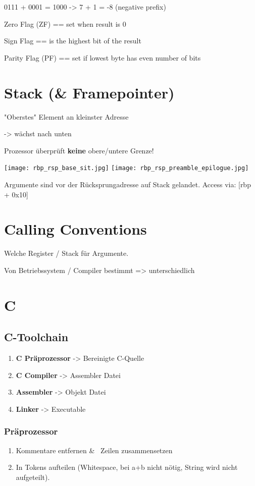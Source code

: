 \begin{multicols*}{4}
0111 + 0001 = 1000 -> 7 + 1 = -8 (negative prefix)

Zero Flag (ZF) == set when result is 0

Sign Flag == is the highest bit of the result

Parity Flag (PF) == set if lowest byte has even number of bits

\section{Stack (\& Framepointer)}
"Oberstes" Element an kleinster Adresse

-> wächst nach unten

Prozessor überprüft \textbf{keine} obere/untere Grenze!

\texttt{[image: rbp\_rsp\_base\_sit.jpg]}
\texttt{[image: rbp\_rsp\_preamble\_epilogue.jpg]}

Argumente sind vor der Rücksprungadresse auf Stack gelandet. Access via: [rbp + 0x10]

\section{Calling Conventions}
Welche Register / Stack für Argumente.

Von Betriebssystem / Compiler bestimmt => unterschiedlich

\section{C}
\subsection{C-Toolchain}
\begin{enumerate}
    \item \textbf{C Präprozessor} -> Bereinigte C-Quelle
    \item \textbf{C Compiler} -> Assembler Datei
    \item \textbf{Assembler} -> Objekt Datei
    \item \textbf{Linker} -> Executable
\end{enumerate}
\subsubsection{Präprozessor}
\begin{enumerate}
    \item Kommentare entfernen \& \ Zeilen zusammensetzen
    \item In Tokens aufteilen (Whitespace, bei a+b nicht nötig, String wird nicht aufgeteilt).


\end{enumerate}
\end{multicols*}
